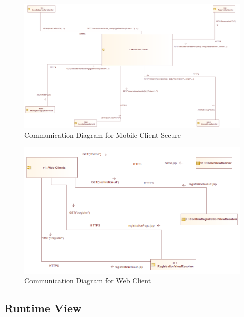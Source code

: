 \documentclass[12pt]{article}
\begin{document}
\begin{figure}[h]
	\centering
	\includegraphics[width=\textwidth]{../Images/MobileClient_SecuredCommunication}
	\caption{Communication Diagram for Mobile Client Secure}
\end{figure}

\begin{figure}[h]
	\centering
	\includegraphics[width=\textwidth]{../Images/WebClient_Communication}
	\caption{Communication Diagram for Web Client}
\end{figure}
\clearpage

\subsection{Runtime View}
\end{document}
